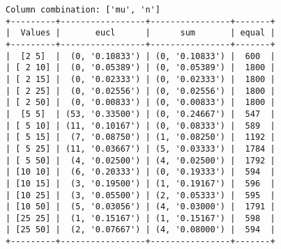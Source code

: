 \documentclass{article}
\begin{document}
\begin{verbatim}
Column combination: ['mu', 'n']
+---------+-----------------+----------------+-------+
|  Values |       eucl      |      sum       | equal |
+---------+-----------------+----------------+-------+
|  [2 5]  |  (0, '0.10833') | (0, '0.10833') |  600  |
| [ 2 10] |  (0, '0.05389') | (0, '0.05389') |  1800 |
| [ 2 15] |  (0, '0.02333') | (0, '0.02333') |  1800 |
| [ 2 25] |  (0, '0.02556') | (0, '0.02556') |  1800 |
| [ 2 50] |  (0, '0.00833') | (0, '0.00833') |  1800 |
|  [5 5]  | (53, '0.33500') | (0, '0.24667') |  547  |
| [ 5 10] | (11, '0.10167') | (0, '0.08333') |  589  |
| [ 5 15] |  (7, '0.08750') | (1, '0.08250') |  1192 |
| [ 5 25] | (11, '0.03667') | (5, '0.03333') |  1784 |
| [ 5 50] |  (4, '0.02500') | (4, '0.02500') |  1792 |
| [10 10] |  (6, '0.20333') | (0, '0.19333') |  594  |
| [10 15] |  (3, '0.19500') | (1, '0.19167') |  596  |
| [10 25] |  (3, '0.05500') | (2, '0.05333') |  595  |
| [10 50] |  (5, '0.03056') | (4, '0.03000') |  1791 |
| [25 25] |  (1, '0.15167') | (1, '0.15167') |  598  |
| [25 50] |  (2, '0.07667') | (4, '0.08000') |  594  |
+---------+-----------------+----------------+-------+
\end{verbatim}
\end{document}
